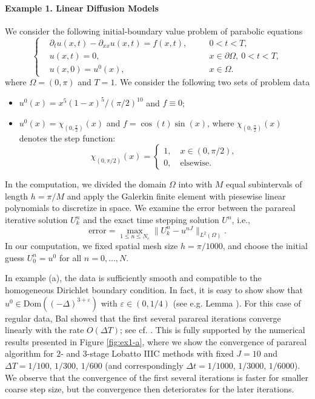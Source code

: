 \documentclass[a4paper, oneside]{book}
\def\epsilon{\varepsilon}
\begin{document}
\paragraph{Example 1. Linear Diffusion Models}
We consider the following initial-boundary value problem of parabolic equations
\begin{equation}\label{eqn:diffusion}
    \left \{
\begin{aligned}
&\partial_t u (x,t) - \partial_{xx} u(x,t) = f(x,t), &&\quad 0<t<T,\\
& u(x,t)=0,&&\quad x\in\partial\Omega,~0<t<T, \\
& u(x,0)=u^0(x),&&\quad x\in\Omega.
\end{aligned}
\right.
\end{equation}
where $\Omega=(0,\pi)$ and $T=1$. We consider the following two sets of problem data
\begin{itemize}
    \item[(a)] $u^0(x) = x^{5}(1-x)^{5}/(\pi/2)^{10}$
    and $f\equiv0$;
    \item[(b)] $u^0(x) = \chi_{(0,\frac\pi2)}(x)$ and $f=\cos(t) \sin(x)$, where $\chi_{(0,\frac\pi2)}(x)$ denotes the step function:
    \begin{equation*}
 \chi_{(0,\pi/2)}(x)  =
 \begin{cases}
 1, \quad x\in(0,\pi/2),\\
0, \quad \text{elsewise}.
 \end{cases}
\end{equation*}
\end{itemize}

In the computation, we divided the domain $\Omega$ into with $M$ equal subintervals of length $h=\pi/M$ and apply the Galerkin finite element with piesewise linear polynomials to discretize in space.
We examine the error between the parareal iterative solution $U_k^n$ and the exact time stepping solution $U^n$, i.e.,
{$$ \text{error} = \max_{1\le n\le N_c}  \| U_k^n - u^{nJ} \|_{L^2(\Omega)} .  $$}
In our computation, we fixed
spatial mesh size $h=\pi/1000$, and choose the initial guess
$U_0^n = u^0$ for all $n=0,\ldots,N$.

In example (a), the data is sufficiently smooth and compatible to the homogeneous Dirichlet boundary condition. In fact, it is easy to show show that $u^0 \in \text{Dom}((-\Delta)^{3+\epsilon})$ with $\epsilon\in(0,1/4)$  (see e.g. Lemma \cite[Lemma 3.1]{Thomee:2006}). For this case of regular data, Bal showed that the first several parareal iterations converge linearly with the rate $O(\Delta T)$; see cf. \cite{Bal:2005}. This is fully supported by the numerical results presented in Figure \ref{fig:ex1-a}, where we show the convergence of parareal algorithm for $2$- and $3$-stage Lobatto IIIC methods with
fixed $J=10$ and $\Delta T = 1/100$, $1/300$, $1/600$ (and correspondingly $\Delta t = 1/1000$, $1/3000$, $1/6000$).
We observe that the convergence of the first several iterations is faster for smaller coarse step size,
but the convergence then deteriorates for the later iterations.
\end{document}
